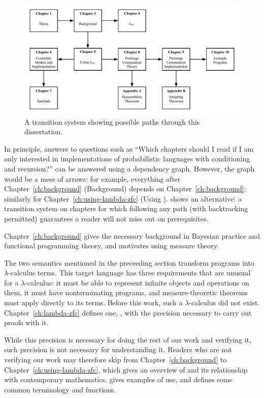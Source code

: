 \begin{figure}[!tb]\centering
\includegraphics[width=\textwidth]{figures/reading-graph}
\caption[A transition system for reading this dissertation]{A transition system showing possible paths through this dissertation.}
\label{fig:reading-graph}
\end{figure}

In principle, answers to questions such as ``Which chapters should I read if I am only interested in implementations of probabilistic languages with conditioning and recursion?'' can be answered using a dependency graph.
However, the graph would be a mess of arrows: for example, everything after Chapter~\ref{ch:background} (Background) depends on Chapter~\ref{ch:background}; similarly for Chapter~\ref{ch:using-lambda-zfc} (Using \lzfclang).
 shows an alternative: a transition system on chapters for which following any path (with backtracking permitted) guarantees a reader will not miss out on prerequisites.

Chapter~\ref{ch:background} gives the necessary background in Bayesian practice and functional programming theory, and motivates using measure theory.

The two semantics mentioned in the preceeding section transform programs into $\lambda$-calculus terms.
This target language has three requirements that are unusual for a $\lambda$-calculus: it must be able to represent infinite objects and operations on them, it must have nonterminating programs, and measure-theoretic theorems must apply directly to its terms.
Before this work, such a $\lambda$-calculus did not exist.
Chapter~\ref{ch:lambda-zfc} defines one, \lzfclang, with the precision necessary to carry out proofs with it.

While this precision is necessary for doing the rest of our work and verifying it, such precision is not necessary for understanding it.
Readers who are not verifying our work may therefore skip from Chapter~\ref{ch:background} to Chapter~\ref{ch:using-lambda-zfc}, which gives an overview of \lzfclang and its relationship with contemporary mathematics, gives examples of use, and defines some common terminology and functions.

